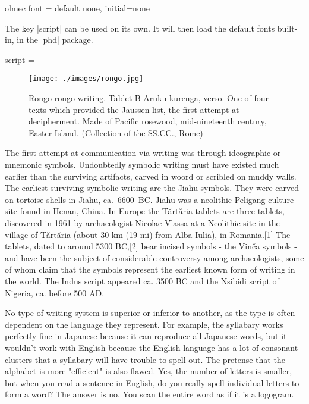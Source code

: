 \def\olmecfontstore{}

\cxset{olmec font/.store in=\olmecfontstore}


\begin{docKey}[phd]{olmec font}{ = } {default none, initial=none}
\end{docKey}

The key |script| can be used on its own. It will then load the default fonts built-in, in the |phd| package.


\begin{docKey}[phd]{script =}{ }{}
\end{docKey}

\begin{figure}[b]
\centering
\texttt{[image: ./images/rongo.jpg]}
\caption{Rongo rongo writing. Tablet B Aruku kurenga, verso. One of four texts which provided the Jaussen list, the first attempt at decipherment. Made of Pacific rosewood, mid-nineteenth century, Easter Island.
(Collection of the SS.CC., Rome)}
\end{figure}

The first attempt  at communication via writing was through ideographic or mnemonic symbols. Undoubtedly symbolic writing must have existed much earlier than the surviving artifacts, carved in woord or scribled on muddy walls. The earliest surviving symbolic writing are the Jiahu symbols. They were carved on tortoise shells in Jiahu, ca.~6600~BC. Jiahu was a neolithic Peligang culture site found in Henan, China. In Europe the Tărtăria tablets are three tablets, discovered in 1961 by archaeologist Nicolae Vlassa at a Neolithic site in the village of Tărtăria (about 30 km (19 mi) from Alba Iulia), in Romania.[1] The tablets, dated to around 5300 BC,[2] bear incised symbols - the Vinča symbols - and have been the subject of considerable controversy among archaeologists, some of whom claim that the symbols represent the earliest known form of writing in the world. The Indus script appeared ca. 3500 BC and the Nsibidi script of Nigeria, ca. before 500 AD. 

No type of writing system is superior or inferior to another, as the type is often dependent on the language they represent. For example, the syllabary works perfectly fine in Japanese because it can reproduce all Japanese words, but it wouldn't work with English because the English language has a lot of consonant clusters that a syllabary will have trouble to spell out. The pretense that the alphabet is more "efficient" is also flawed. Yes, the number of letters is smaller, but when you read a sentence in English, do you really spell individual letters to form a word? The answer is no. You scan the entire word as if it is a logogram.

